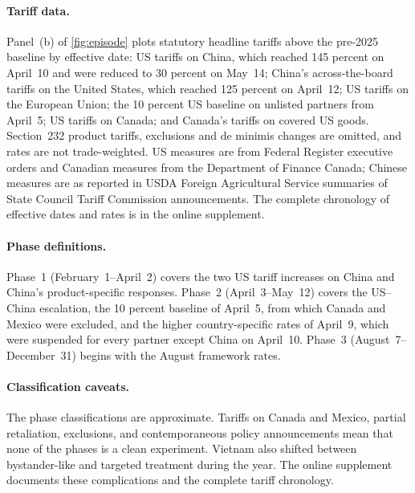 \paragraph{Tariff data.} Panel~(b) of \cref{fig:episode} plots statutory headline tariffs above the pre-2025 baseline by effective date: US tariffs on China, which reached 145 percent on April~10 and were reduced to 30 percent on May~14; China's across-the-board tariffs on the United States, which reached 125 percent on April~12; US tariffs on the European Union; the 10 percent US baseline on unlisted partners from April~5; US tariffs on Canada; and Canada's tariffs on covered US goods. Section~232 product tariffs, exclusions and de minimis changes are omitted, and rates are not trade-weighted. US measures are from Federal Register executive orders and Canadian measures from the Department of Finance Canada; Chinese measures are as reported in USDA Foreign Agricultural Service summaries of State Council Tariff Commission announcements. The complete chronology of effective dates and rates is in the online supplement.

\paragraph{Phase definitions.} Phase~1 (February~1--April~2) covers the two US tariff increases on China and China's product-specific responses. Phase~2 (April~3--May~12) covers the US--China escalation, the 10 percent baseline of April~5, from which Canada and Mexico were excluded, and the higher country-specific rates of April~9, which were suspended for every partner except China on April~10. Phase~3 (August~7--December~31) begins with the August framework rates.

\paragraph{Classification caveats.} The phase classifications are approximate. Tariffs on Canada and Mexico, partial retaliation, exclusions, and contemporaneous policy announcements mean that none of the phases is a clean experiment. Vietnam also shifted between bystander-like and targeted treatment during the year. The online supplement documents these complications and the complete tariff chronology.

